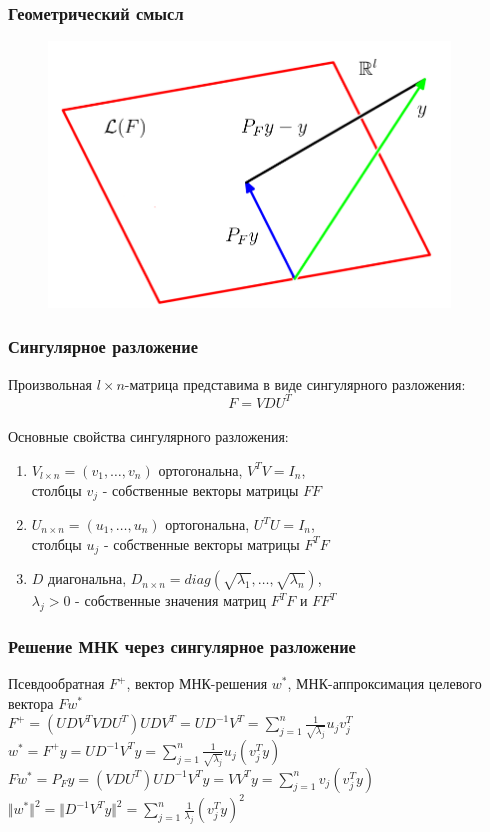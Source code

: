 \documentclass[12pt]{beamer}
\begin{document}
\begin{frame}\frametitle{Геометрический смысл}
\begin{figure}[htbp]
  \includegraphics[height=200pt, keepaspectratio = true]{images/geometry}   
\end{figure}
\end{frame}

\begin{frame}\frametitle{Сингулярное разложение}
Произвольная $l \times n$-матрица представима в виде сингулярного разложения:\\
$$F = VDU^T$$\\
Основные свойства сингулярного разложения:\\
\begin{enumerate}[--]
\item $V_{l \times n} = (v_1, \dots, v_n)$ ортогональна, $V^TV = I_n$, \\столбцы $v_j$ - собственные векторы матрицы $FF$
\item $U_{n \times n} = (u_1, \dots, u_n)$ ортогональна, $U^TU = I_n$, \\столбцы $u_j$ - собственные векторы матрицы $F^TF$
\item $D$ диагональна, $D_{n \times n} = diag (\sqrt{\lambda_1}, \dots, \sqrt{\lambda_n})$, \\$\lambda_j > 0$ - собственные значения матриц $F^TF$ и $FF^T$
\end{enumerate}
\end{frame}

\begin{frame}\frametitle{Решение МНК через сингулярное разложение}
Псевдообратная $F^+$, вектор МНК-решения $w^*$,
МНК-аппроксимация целевого вектора $Fw^*$\\
$F^+ = (UDV^TVDU^T)UDV^T = UD^{-1}V^T = \sum\limits_{j=1}^n \frac{1}{\sqrt{\lambda_j}}  u_j v_j^T$\\
$ w^* = F^+y = UD^{-1}V^Ty = \sum\limits_{j=1}^n \frac{1}{\sqrt{\lambda_j}}  u_j (v_j^Ty)$\\
$F w^* = P_F y = (VDU^T)UD^{-1}V^Ty = VV^Ty = \sum\limits_{j=1}^n v_j (v_j^Ty)$\\
$\Vert w^* \Vert^2  = \Vert D^{-1}V^Ty \Vert^2 = \sum\limits_{j=1}^n \frac{1}{\lambda_j} (v_j^Ty)^2$
\end{frame}
\end{document}
